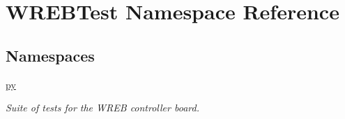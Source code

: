 \hypertarget{namespace_w_r_e_b_test}{}\section{W\+R\+E\+B\+Test Namespace Reference}
\label{namespace_w_r_e_b_test}
\subsection*{Namespaces}
\begin{DoxyCompactItemize}
\item 
 \hyperlink{namespace_w_r_e_b_test_1_1py}{py}
\begin{DoxyCompactList}\small\item\em Suite of tests for the W\+R\+EB controller board. \end{DoxyCompactList}\end{DoxyCompactItemize}
